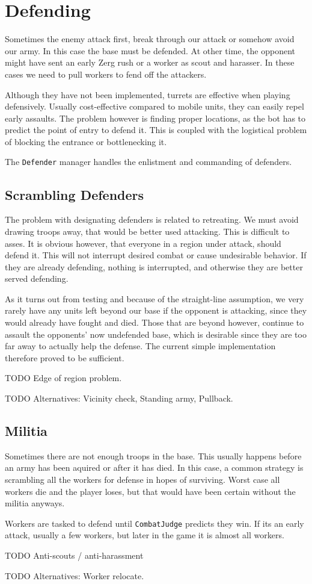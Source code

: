 \section{Defending}
Sometimes the enemy attack first, break through our attack or somehow avoid our army. In this case the base must be defended. At other time, the opponent might have sent an early Zerg rush or a worker as scout and harasser. In these cases we need to pull workers to fend off the attackers.

Although they have not been implemented, turrets are effective when playing defensively. Usually cost-effective compared to mobile units, they can easily repel early assaults. The problem however is finding proper locations, as the bot has to predict the point of entry to defend it. This is coupled with the logistical problem of blocking the entrance or bottlenecking it.

The \texttt{Defender} manager handles the enlistment and commanding of defenders.

	\subsection*{Scrambling Defenders}
	The problem with designating defenders is related to retreating. We must avoid drawing troops away, that would be better used attacking. This is difficult to asses. It is obvious however, that everyone in a region under attack, should defend it. This will not interrupt desired combat or cause undesirable behavior. If they are already defending, nothing is interrupted, and otherwise they are better served defending.
	
	As it turns out from testing and because of the straight-line assumption, we very rarely have any units left beyond our base if the opponent is attacking, since they would already have fought and died. Those that are beyond however, continue to assault the opponents' now undefended base, which is desirable since they are too far away to actually help the defense. The current simple implementation therefore proved to be sufficient.
	
	TODO Edge of region problem.
	
	TODO Alternatives: Vicinity check, Standing army, Pullback.

	\subsection*{Militia}
	Sometimes there are not enough troops in the base. This usually happens before an army has been aquired or after it has died. In this case, a common strategy is scrambling all the workers for defense in hopes of surviving. Worst case all workers die and the player loses, but that would have been certain without the militia anyways.
	
	Workers are tasked to defend until \texttt{CombatJudge} predicts they win. If its an early attack, usually a few workers, but later in the game it is almost all workers.
	
	TODO Anti-scouts / anti-harassment
	
	TODO Alternatives: Worker relocate.
